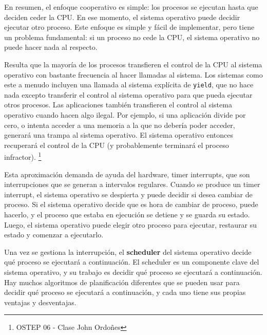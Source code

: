 \documentclass{article}
\begin{document}
\begin{mdframed}[backgroundcolor=gray!10]
    En resumen, el enfoque cooperativo es simple: los procesos se ejecutan hasta que deciden ceder la CPU. En ese momento, el sistema operativo puede decidir ejecutar otro proceso. Este enfoque es simple y fácil de implementar, pero tiene un problema fundamental: si un proceso no cede la CPU, el sistema operativo no puede hacer nada al respecto.
\end{mdframed}

Resulta que la mayoría de los procesos transfieren el control de la CPU al sistema operativo con bastante frecuencia al hacer llamadas al sistema. Los sistemas como este a menudo incluyen una llamada al sistema explícita de \texttt{yield}, que no hace nada excepto transferir el control al sistema operativo para que pueda ejecutar otros procesos. Las aplicaciones también transfieren el control al sistema operativo cuando hacen algo ilegal. Por ejemplo, si una aplicación divide por cero, o intenta acceder a una memoria a la que no debería poder acceder, generará una trampa al sistema operativo. El sistema operativo entonces recuperará el control de la CPU (y probablemente terminará el proceso infractor). \footnote{OSTEP 06 - Clase John Ordoñes}

Esta aproximación demanda de ayuda del hardware, timer interrupts, que son interrupciones que se generan a intervalos regulares. Cuando se produce un timer interrupt, el sistema operativo se despierta y puede decidir si desea cambiar de proceso. Si el sistema operativo decide que es hora de cambiar de proceso, puede hacerlo, y el proceso que estaba en ejecución se detiene y se guarda su estado. Luego, el sistema operativo puede elegir otro proceso para ejecutar, restaurar su estado y comenzar a ejecutarlo.

Una vez se gestiona la interrupción, el \textbf{scheduler} del sistema operativo decide qué proceso se ejecutará a continuación. El scheduler es un componente clave del sistema operativo, y su trabajo es decidir qué proceso se ejecutará a continuación. Hay muchos algoritmos de planificación diferentes que se pueden usar para decidir qué proceso se ejecutará a continuación, y cada uno tiene sus propias ventajas y desventajas.
\end{document}
